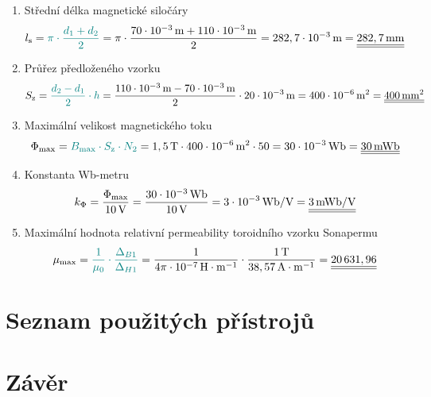 \documentclass[a4paper, czech]{article}
\begin{document}
\begin{enumerate}
    \item Střední délka magnetické siločáry
    \begin{multline*}
        l_\text{s} = \textcolor{teal}{\pi \cdot \frac{d_1 + d_2}{2}} = \pi \cdot \frac{70 \cdot 10^{-3}\,\text{m} + 110 \cdot 10^{-3}\,\text{m}}{2} = 282,7 \cdot 10^{-3}\,\text{m} = \underline{\underline{282,7\,\text{mm}}} \hfill
    \end{multline*}
    \item Průřez předloženého vzorku
    \begin{multline*}
        S_\text{z} = \textcolor{teal}{\frac{d_2 - d_1}{2} \cdot h} = \frac{110 \cdot 10^{-3}\,\text{m} - 70 \cdot 10^{-3}\,\text{m}}{2} \cdot 20 \cdot 10^{-3}\,\text{m} = 400 \cdot 10^{-6}\,\text{m}^2 = \underline{\underline{400\,\text{mm}^2}} \hfill
    \end{multline*}
    \item Maximální velikost magnetického toku
    \begin{multline*}
        \Phi_{\text{max}} = \textcolor{teal}{B_\text{max} \cdot S_\text{z} \cdot N_2} = 1,5\,\text{T} \cdot 400 \cdot 10^{-6}\,\text{m}^2 \cdot 50 = 30 \cdot 10^{-3}\,\text{Wb} = \underline{\underline{30\,\text{mWb}}} \hfill
    \end{multline*}
    \item{Konstanta Wb-metru}
    \begin{multline*}
        k_\Phi = \frac{\Phi_{\text{max}}}{10\,\text{V}} = \frac{30 \cdot 10^{-3}\,\text{Wb}}{10\,\text{V}} = 3 \cdot 10^{-3}\,\text{Wb/V} = \underline{\underline{3\,\text{mWb/V}}} \hfill
    \end{multline*}
    \item Maximální hodnota relativní permeability toroidního vzorku Sonapermu
    \begin{multline*}
        \mu_\text{max} = \textcolor{teal}{\frac{1}{\mu_0} \cdot \frac{\Delta_{B1}}{\Delta_{H1}}} = \frac{1}{4 \pi \cdot 10^{-7}\,\text{H}\cdot\text{m}^{-1}} \cdot \frac{1\,\text{T}}{38,57\,\text{A}\cdot\text{m}^{-1}} = \underline{\underline{20\,631,96}} \hfill
    \end{multline*}
\end{enumerate}

\section{Seznam použitých přístrojů}

\section{Závěr}
\end{document}
